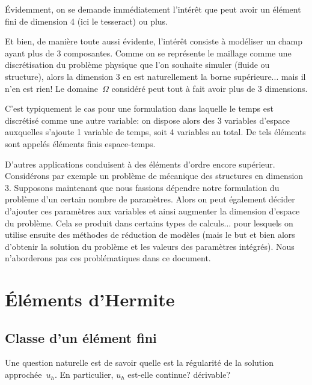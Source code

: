 \begin{remarque}[Utilité]
Évidemment, on se demande immédiatement l'intérêt que peut avoir un élément fini de dimension 4 (ici le tesseract) ou plus.

Et bien, de manière toute aussi évidente, l'intérêt consiste à modéliser un champ ayant plus de 3 composantes.
Comme on se représente le maillage comme une discrétisation du problème physique que l'on souhaite simuler (fluide ou structure), alors la dimension 3 en est naturellement la borne supérieure... mais il n'en est rien!
Le domaine~$\Omega$ considéré peut tout à fait avoir plus de 3 dimensions.

C'est typiquement le cas pour une formulation dans laquelle le temps est discrétisé comme une autre variable: on dispose alors des 3 variables d'espace auxquelles s'ajoute 1 variable de temps, soit 4 variables au total. De tels éléments sont appelés éléments finis espace-temps.

D'autres applications conduisent à des éléments d'ordre encore supérieur.
Considérons par exemple un problème de mécanique des structures en dimension 3. Supposons maintenant que nous fassions dépendre notre formulation du problème d'un certain nombre de paramètres. Alors on peut également décider d'ajouter ces paramètres aux variables et ainsi augmenter la dimension d'espace du problème. Cela se produit dans certains types de calculs... pour lesquels on utilise ensuite des méthodes de réduction de modèles (mais le but et bien alors d'obtenir la solution du problème et les valeurs des paramètres intégrés). Nous n'aborderons pas ces problématiques dans ce document.
\end{remarque}

\medskip



\medskip
\section{Éléments d'Hermite}

\medskip
\subsection{Classe d'un élément fini}

Une question naturelle est de savoir quelle est la régularité de la solution approchée~$u_h$. En particulier, $u_h$ est-elle continue? dérivable?

